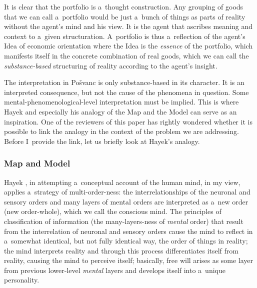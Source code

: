 It is clear that the portfolio is a~thought construction. Any grouping of goods that we can call a~portfolio would be just a~bunch of things as parts of reality without the agent's mind and his view. It is the agent that ascribes meaning and context to a~given structuration. A~portfolio is thus a~reflection of the agent's Idea of economic orientation where the Idea is the \textit{essence} of the portfolio, which manifests itself in the concrete combination of real goods, which we can call the \textit{substance-based} structuring of reality according to the agent's insight.



The interpretation in Pošvanc 
\parencite*[][]{} %
 is only substance-based in its character. It is an interpreted consequence, but not the cause of the phenomena in question. Some mental-phenomenological-level interpretation must be implied. This is where Hayek 
\parencite*[][]{} %
 and especially his analogy of the Map and the Model can serve as an inspiration. One of the reviewers of this paper has rightly wondered whether it is possible to link the analogy in the context of the problem we are addressing. Before I~provide the link, let us briefly look at Hayek's analogy.



\subsubsection*{Map and Model }



Hayek 
\parencite*[][]{}, %
 in attempting a~conceptual account of the human mind, in my view, applies a~strategy of multi-order-ness: the interrelationships of the neuronal and sensory orders and many layers of mental orders are interpreted as a~new order (new order-whole), which we call the conscious mind. The principles of classification of information (the many-layers-ness of \textit{mental} order) that result from the interrelation of neuronal and sensory orders cause the mind to reflect in a~somewhat identical, but not fully identical way, the order of things in reality; the mind interprets reality and through this process differentiates itself from reality, causing the mind to perceive itself; basically, free will arises as some layer from previous lower-level \textit{mental} layers and develops itself into a~unique personality.




